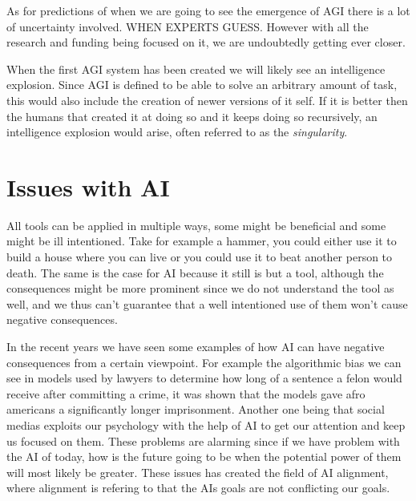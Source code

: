 \documentclass[12pt,A4]{report}
\theoremstyle{definition}
\begin{document}
As for predictions of when we are going to see the emergence of AGI there is a lot of uncertainty involved. WHEN EXPERTS GUESS. However with all the research and funding being focused on it, we are undoubtedly getting ever closer. 


When the first AGI system has been created we will likely see an intelligence explosion. Since AGI is defined to be able to solve an arbitrary amount of task, this would also include the creation of newer versions of it self. If it is better then the humans that created it at doing so and it keeps doing so recursively, an intelligence explosion would arise, often referred to as the \textit{singularity}.

\section{Issues with AI}
All tools can be applied in multiple ways, some might be beneficial and some might be ill intentioned. Take for example a hammer, you could either use it to build a house where you can live or you could use it to beat another person to death. The same is the case for AI because it still is but a tool, although the consequences might be more prominent since we do not understand the tool as well, and we thus can't guarantee that a well intentioned use of them won't cause negative consequences. 

In the recent years we have seen some examples of how AI can have negative consequences from a certain viewpoint. For example the algorithmic bias we can see in models used by lawyers to determine how long of a sentence a felon would receive after committing a crime, it was shown that the models gave afro americans a significantly longer imprisonment. Another one being that social medias exploits our psychology with the help of AI to get our attention and keep us focused on them. These problems are alarming since if we have problem with the AI of today, how is the future going to be when the potential power of them will most likely be greater. These issues has created the field of AI alignment, where alignment is refering to that the AIs goals are not conflicting our goals. 
\end{document}
